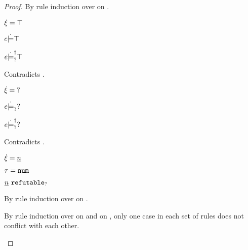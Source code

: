 \begin{proof}
  By rule induction over  on .
  \begin{byCases}
    \item[\text{(\ref{rule:CTTruth})}]
    \begin{pfsteps*}
    \item $\dot{\xi} = \top$ 
    \item $e \dot{\models} \top$  
    \item $e \dot{\models}_{?}^{\dag} \top$ 
    \end{pfsteps*}
    Contradicts .
    \item[\text{(\ref{rule:CTUnknown})}]
    \begin{pfsteps*}
    \item $\dot{\xi} = \mathtt{?}$ 
    \item $e \dot{\models}_{?} \mathtt{?}$  
    \item $e \dot{\models}_{?}^{\dag} \mathtt{?}$ 
    \end{pfsteps*}
    Contradicts .
    \item[\text{(\ref{rule:CTNum})}]
    \begin{pfsteps*}
    \item $\dot{\xi} = \underline{n}$ 
    \item $\tau = \mathtt{num}$ 
    \item $\underline{n} ~\mathtt{refutable}_?$  
    \end{pfsteps*}
    By rule induction over  on .
    \begin{byCases}
    \item[\text{(\ref{rule:FVal})}]
      \begin{pfsteps}
        \item {}  
      \end{pfsteps}
      By rule induction over  on  and
       on , only one case in each set
      of rules does not conflict with each other.
      

\end{byCases}
\end{byCases}
\end{proof}
